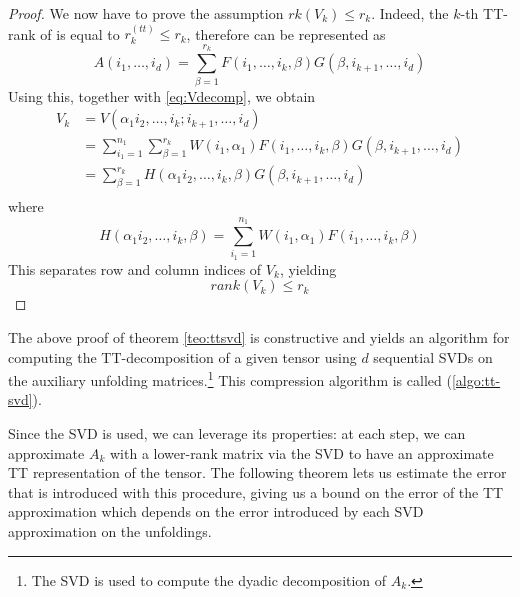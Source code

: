 \begin{Teo}
\begin{proof}
    We now have to prove the assumption $rk(V_k) \leq r_k$. Indeed, the $k$-th TT-rank of \A is equal to $r^{(tt)}_k \leq r_k$, therefore \A can be represented as
    \begin{equation*}
      A(i_1,\ldots,i_d) = \sum_{\beta=1}^{r_k} F(i_1,\ldots,i_k,\beta) G(\beta,i_{k+1},\ldots,i_d)
    \end{equation*}
    Using this, together with \eqref{eq:Vdecomp}, we obtain
    \begin{align*}
      V_k &= V(\alpha_1 i_2,\ldots,i_k;i_{k+1},\ldots,i_d) \\
      &= \sum_{i_1 = 1}^{n_1} \sum_{\beta = 1}^{r_k} W(i_1, \alpha_1) F(i_1,\ldots,i_k,\beta) G(\beta,i_{k+1},\ldots,i_d) \\
      &= \sum_{\beta = 1}^{r_k} H(\alpha_1 i_2,\ldots,i_k,\beta) G(\beta,i_{k+1},\ldots,i_d) \\
    \end{align*}
    where
    \begin{equation*}
      H(\alpha_1 i_2,\ldots,i_k,\beta) = \sum_{i_1 = 1}^{n_1} W(i_1, \alpha_1) F(i_1,\ldots,i_k,\beta)
    \end{equation*}
    This separates row and column indices of $V_k$, yielding
    \begin{equation*}
      rank(V_k) \leq r_k
    \end{equation*}
  \end{proof}
  
\end{Teo}

The above proof of theorem \ref{teo:ttsvd} is constructive and yields an algorithm for computing the TT-decomposition of a given tensor using $d$ sequential SVDs on the auxiliary unfolding matrices.\footnote{The SVD is used to compute the dyadic decomposition of $A_k$.} This  compression algorithm is called  (\ref{algo:tt-svd}).

Since the SVD is used, we can leverage its properties: at each step, we can approximate $A_k$ with a lower-rank matrix via the SVD to have an approximate TT representation of the tensor. The following theorem lets us estimate the error that is introduced with this procedure, giving us a bound on the error of the TT approximation which depends on the error introduced by each SVD approximation on the unfoldings.

